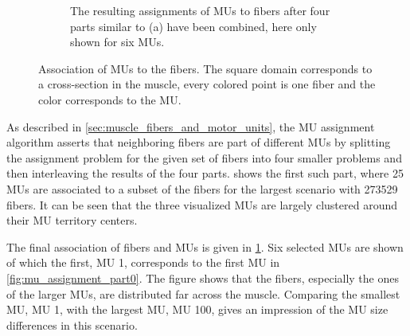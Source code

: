 \begin{figure}
\begin{subfigure}[t]{0.47\textwidth}
    \caption{The resulting assignments of MUs to fibers after four parts similar to (a) have been combined, here only shown for six MUs.}%
    \label{fig:mu_assignment_total}%
  \end{subfigure} 
  \caption{Association of MUs to the fibers. The square domain corresponds to a cross-section in the muscle, every colored point is one fiber and the color corresponds to the MU. }%
  \label{fig:mu_assignment_100}%
\end{figure}%

As described in \cref{sec:muscle_fibers_and_motor_units}, the MU assignment algorithm asserts that neighboring fibers are part of different MUs by splitting the assignment problem for the given set of fibers into four smaller problems and then interleaving the results of the four parts.  shows the first such part, where 25 MUs are associated to a subset of the fibers for the largest scenario with \num{273529} fibers. It can be seen that the three visualized MUs are largely clustered around their MU territory centers.

The final association of fibers and MUs is given in \cref{fig:mu_assignment_total}. Six selected MUs are shown of which the first, MU 1, corresponds to the first MU in \cref{fig:mu_assignment_part0}. The figure shows that the fibers, especially the ones of the larger MUs, are distributed far across the muscle. Comparing the smallest MU, MU 1, with the largest MU, MU 100, gives an impression of the MU size differences in this scenario.


